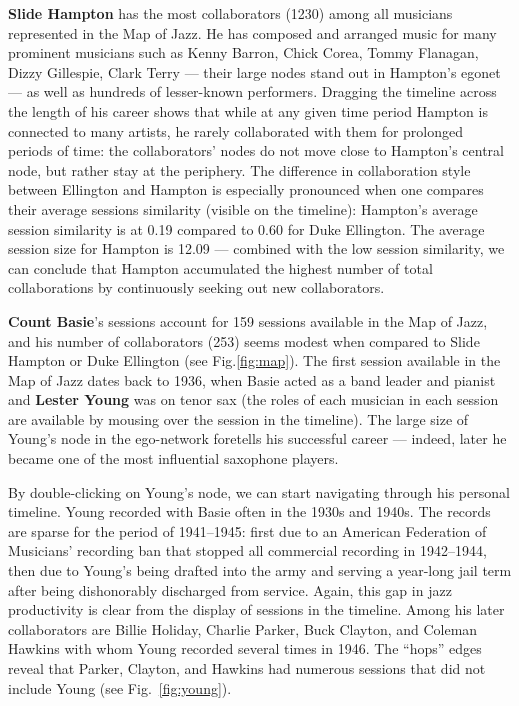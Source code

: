 \documentclass[12pt]{cmuthesis}
\begin{document}
  \textbf{Slide Hampton} has the most collaborators (1230) among all musicians
  represented in the Map of Jazz. He has composed and arranged music for many
  prominent musicians such as Kenny Barron, Chick Corea, Tommy Flanagan, Dizzy
  Gillespie, Clark Terry --- their large nodes stand out in Hampton's egonet ---
  as well as hundreds of lesser-known performers. Dragging the timeline across the
  length of his career shows that while at any given time period Hampton is
  connected to many artists, he rarely collaborated with them for prolonged
  periods of time: the collaborators' nodes do not move close to Hampton's central
  node, but rather stay at the periphery. The difference in collaboration style
  between Ellington and Hampton is especially pronounced when one compares their
  average sessions similarity (visible on the timeline): Hampton's average session
  similarity is at 0.19 compared to 0.60 for Duke Ellington. The average session
  size for Hampton is 12.09 --- combined with the low session similarity,
  we can conclude that Hampton accumulated the highest number of total
  collaborations by continuously seeking out new collaborators.

  \textbf{Count Basie}'s sessions account for 159 sessions available in the Map
  of Jazz, and his number of collaborators (253) seems modest when compared to
  Slide Hampton or Duke Ellington (see Fig.\@\ref{fig:map}). The first session
  available in the Map of Jazz dates back to 1936, when Basie acted as a band
  leader and pianist and \textbf{Lester Young} was on tenor sax (the roles of each musician
  in each session are available by mousing over the session in the timeline). The
  large size of Young's node in the ego-network foretells his successful
  career --- indeed, later he became one of the most influential saxophone
  players.

  By double-clicking on Young's node, we can start navigating through his
  personal timeline. Young recorded with Basie often in the 1930s and 1940s. The
  records are sparse for the period of 1941--1945: first due to an American
  Federation of Musicians' recording ban that stopped all commercial recording in
  1942--1944, then due to Young's being drafted into
  the army and serving a year-long jail term after being dishonorably discharged
  from service. Again, this gap in jazz productivity is clear from the display of
  sessions in the timeline.  Among his later collaborators are Billie Holiday,
  Charlie Parker, Buck Clayton, and Coleman Hawkins with whom Young recorded
  several times in 1946. The ``hops'' edges reveal that Parker, Clayton,
  and Hawkins had numerous sessions that did not include Young (see
  Fig.~\ref{fig:young}).
\end{document}
